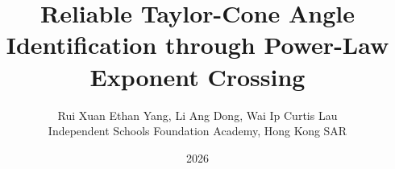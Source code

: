 \documentclass[11pt]{article}
\title{\textbf{Reliable Taylor-Cone Angle Identification through Power-Law Exponent Crossing}}
\author{Rui Xuan Ethan Yang, Li Ang Dong, Wai Ip Curtis Lau\\
Independent Schools Foundation Academy, Hong Kong SAR}
\date{2026}
\begin{document}
\maketitle

\begin{abstract}
\setlength{\emergencystretch}{2em}

\end{abstract}

\tableofcontents
\newpage










\newpage


\end{document}
